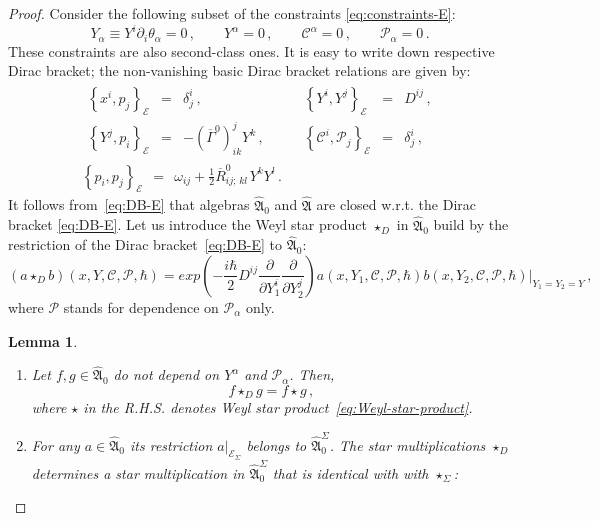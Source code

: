 \documentclass[a4paper,11pt]{amsart}
\newtheorem{lemma}[thm]{Lemma}
\numberwithin{thm}{section} %
\numberwithin{equation}{section} %
\numberwithin{figure}{section} %
\newcommand{\pb}[2]{\left\{{}#1{},{}#2{}\right\}}
\renewcommand{\:}{{\rm\, :\,}}
\def\bar{\overline}
\def\d{\partial}
\newcommand{\dl}[1]{\displaystyle\frac{{\d}}{\d #1}}
\def\half{{\frac{1}{2}}}
\def\cP{{\mathcal P}}
\def\cc{{\mathcal C}}
\def\qA{{\hat{\mathfrak A}}}
\def\E{{ \mathcal E}}
\def\con{{\bar\Gamma}}
\begin{document}
\begin{proof}
Consider the following subset of the constraints
\eqref{eq:constraints-E}:
\begin{equation}
Y_\alpha\equiv Y^i \d_i \theta_\alpha=0\,, \qquad Y^\alpha=0\,,\qquad
\cc^\alpha=0\,,\qquad \cP_\alpha=0\,.
\label{eq:constraints-E-2}
\end{equation}
These constraints are also second-class ones. It is easy to write down
respective Dirac bracket; the non-vanishing basic Dirac bracket
relations are given by:
\begin{equation}
\begin{gathered}
  \label{eq:DB-E}
  \begin{array}{rclrcl}
    \pb{x^i}{p_j}_{\E}&=&\delta^i_j\,, \qquad &
    \pb{Y^i}{Y^j}_{\E}&=&D^{ij}\,,\\[5pt]
    \pb{Y^j}{p_i}_{\E}&=&-(\con^0)^j_{ik}Y^k\,,\qquad &
    \pb{\cc^i}{\cP_j}_{\E}&=&\delta^i_j\,,
  \end{array}\\[4pt]
\pb{p_i}{p_j}_{\E}~~=~~\omega_{ij}+
{\half}{\bar R}^0_{ij;\,kl\,}Y^kY^l\,.
\end{gathered}
\end{equation}
It follows from~\eqref{eq:DB-E} that algebras $\qA_0$
and $\qA$ are closed w.r.t. the Dirac bracket \eqref{eq:DB-E}.
Let us introduce the Weyl star product $\star_D$ in $\qA_0$
build by the restriction of the Dirac bracket~\eqref{eq:DB-E}
to $\qA_0$:
\begin{equation}
\label{eq:Weyl-star-product-D}
(a \star_D b)(x,Y,\cc,\cP,\hbar)= exp ( -\frac{i\hbar}{2}
D^{ij} \dl{Y_1^i} \dl{Y_2^j})
a(x,Y_1,\cc,\cP,\hbar)b(x,Y_2,\cc,\cP,\hbar){\bigr|}_{Y_1=Y_2=Y} \,,
\end{equation}
where $\cP$ stands for dependence on $\cP_\alpha$ only.
\begin{lemma}\label{lemma:2}
\begin{enumerate}
\item
Let $f,g\in \qA_0$ do not depend on $Y^\alpha$ and $\cP_\alpha$. Then,
\begin{equation}
  f\star_D g=f \star g\,,
\end{equation}
where $\star$ in the R.H.S. denotes Weyl
star product~\eqref{eq:Weyl-star-product}.
\item For any $a\in \qA_0$ its restriction $a{\bigr|}_{\E_\Sigma}$
belongs to $\qA^\Sigma_0$. The star multiplications $\star_D$
determines a star multiplication in $\qA^\Sigma_0$
that is identical with with $\star_\Sigma$:
\begin{equation}

\end{equation}
\end{enumerate}
\end{lemma}
\end{proof}
\end{document}
